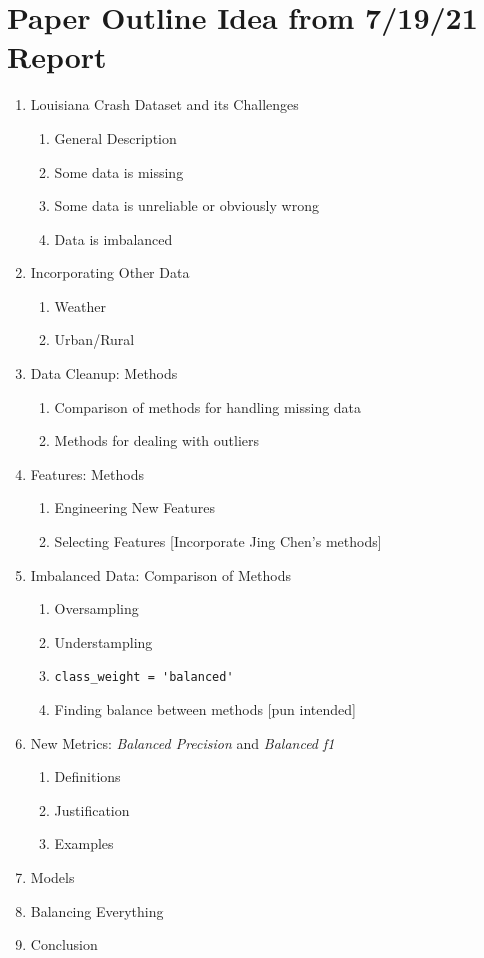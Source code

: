 \section{Paper Outline Idea from 7/19/21 Report}

\begin{enumerate}
	\item Louisiana Crash Dataset and its Challenges
	\begin{enumerate}[label=\alph*.]
		\item General Description
		\item Some data is missing
		\item Some data is unreliable or obviously wrong
		\item Data is imbalanced
	\end{enumerate}
	\item Incorporating Other Data
	\begin{enumerate}[label=\alph*.]
		\item Weather
		\item Urban/Rural
	\end{enumerate}
	
	\item Data Cleanup:  Methods
	\begin{enumerate}[label=\alph*.]
		\item Comparison of methods for handling missing data
		\item Methods for dealing with outliers
	\end{enumerate}
	\item Features:  Methods
	\begin{enumerate}[label=\alph*.]
		\item Engineering New Features
		\item Selecting Features [Incorporate Jing Chen's methods]
	\end{enumerate}
	\item Imbalanced Data:  Comparison of Methods
	\begin{enumerate}[label=\alph*.]
		\item Oversampling
		\item Understampling
		\item \verb|class_weight = 'balanced'|
		\item Finding balance between methods [pun intended]
	\end{enumerate}
	\item New Metrics: {\it Balanced Precision} and {\it Balanced f1}
	\begin{enumerate}[label=\alph*.]
		\item Definitions
		\item Justification
		\item Examples
	\end{enumerate}
	\item Models
	\item Balancing Everything
	\item Conclusion
	
\end{enumerate}
 


